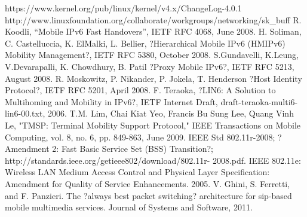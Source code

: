 \begin{thebibliography}{90}   
\rhead[\fancyplain{}{\bfseries \leftmark}]{\fancyplain{}{\bfseries
\thepage}}
 https://www.kernel.org/pub/linux/kernel/v4.x/ChangeLog-4.0.1
 http://www.linuxfoundation.org/collaborate/workgroups/networking/sk\_buff
 R. Koodli, ``Mobile IPv6 Fast Handovers'', IETF RFC 4068, June 2008.
  H. Soliman, C. Castelluccia, K. ElMalki, L. Bellier, ?Hierarchical Mobile IPv6 (HMIPv6) Mobility Management?, IETF RFC 5380, October 2008.
 S.Gundavelli, K.Leung, V.Devarapalli, K. Chowdhury, B. Patil ?Proxy Mobile IPv6?, IETF RFC 5213, August 2008.
 R. Moskowitz, P. Nikander, P. Jokela, T. Henderson ?Host Identity Protocol?, IETF RFC 5201, April 2008. 
 F. Teraoka, ?LIN6: A Solution to Multihoming and Mobility in IPv6?, IETF Internet Draft, draft-teraoka-multi6-lin6-00.txt, 2006.
	T.M. Lim, Chai Kiat Yeo, Francis Bu Sung Lee, Quang Vinh Le, "TMSP: Terminal Mobility Support Protocol," IEEE Transactions on Mobile Computing, vol. 8, no. 6, pp. 849-863, June 2009.
 IEEE Std 802.11r-2008; ?Amendment 2: Fast Basic Service Set (BSS) Transition?; http://standards.ieee.org/getieee802/download/802.11r- 2008.pdf.
 IEEE 802.11e: Wireless LAN Medium Access Control and Physical Layer Specification: Amendment for Quality of Service Enhancements. 2005.
 V. Ghini, S. Ferretti, and F. Panzieri. The ?always best packet switching? architecture for sip-based mobile multimedia services. Journal of Systems and Software, 2011.
\end{thebibliography}

